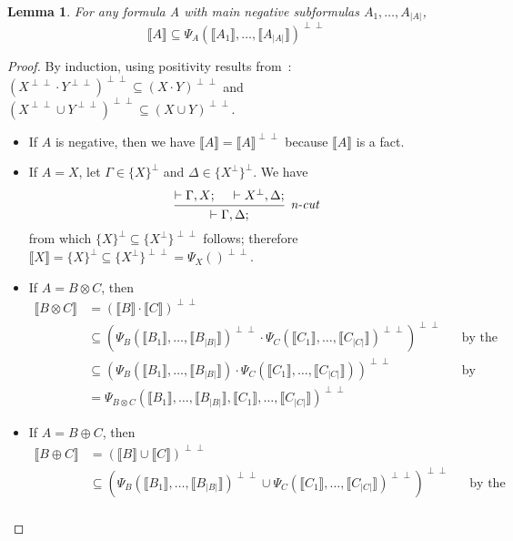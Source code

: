 \documentclass[11pt]{article}
\newtheorem{lemma}[theorem]{Lemma}
\newcommand\size[1]{{\lvert #1 \rvert}}
\newcommand\sem[1]{{\llbracket #1 \rrbracket}}
\newcommand\biperp{{\perp\perp}}
\begin{document}
\begin{lemma}
    \label{positivity}
    For any formula A with main negative subformulas $A_1, \dots, A_\size{A}$,
    $$\sem{A} \subseteq \Psi_A(\sem{A_1}, \dots, \sem{A_\size{A}})^\biperp$$
\end{lemma}
\begin{proof}
    By induction, using positivity results from~\cite[appendix F]{girard}:
    $(X^\biperp \cdot Y^\biperp)^\biperp \subseteq (X \cdot Y)^\biperp$
    and $(X^\biperp \cup Y^\biperp)^\biperp \subseteq (X \cup Y)^\biperp$.
    \begin{itemize}
        \item If $A$ is negative, then we have $\sem{A} = \sem{A}^\biperp$ because $\sem{A}$ is a fact.
        \item If $A = X$, let $\Gamma \in \{X\}^\perp$ and $\Delta \in \{X^\perp\}^\perp$. We have
        $$\begin{prooftree}
            \hypo{\vdash \Gamma, X;}
            \hypo{\vdash X^\perp, \Delta;}
            \infer2[\textit{n-cut}]{\vdash \Gamma, \Delta;}
        \end{prooftree}$$
        from which $\{X\}^\perp \subseteq \{X^\perp\}^\biperp$ follows; therefore
        $\sem{X} = \{X\}^\perp \subseteq \{X^\perp\}^\biperp = \Psi_X()^\biperp$.
        \item If $A = B \otimes C$, then \begin{align*}
            \sem{B \otimes C}
            &= (\sem{B} \cdot \sem{C})^\biperp \\
            &\subseteq (\Psi_B(\sem{B_1}, \dots, \sem{B_\size{B}})^\biperp \cdot \Psi_C(\sem{C_1}, \dots, \sem{C_\size{C}})^\biperp)^\biperp &&\text{by the induction hypothesis} \\
            &\subseteq (\Psi_B(\sem{B_1}, \dots, \sem{B_\size{B}}) \cdot \Psi_C(\sem{C_1}, \dots, \sem{C_\size{C}}))^\biperp &&\text{by positivity} \\
            &= \Psi_{B \otimes C}(\sem{B_1}, \dots, \sem{B_\size{B}}, \sem{C_1}, \dots, \sem{C_\size{C}})^\biperp
        \end{align*}
        \item If $A = B \oplus C$, then \begin{align*}
            \sem{B \oplus C}
            &= (\sem{B} \cup \sem{C})^\biperp \\
            &\subseteq (\Psi_B(\sem{B_1}, \dots, \sem{B_\size{B}})^\biperp \cup \Psi_C(\sem{C_1}, \dots, \sem{C_\size{C}})^\biperp)^\biperp &&\text{by the induction hypothesis} \\

\end{align*}
\end{itemize}
\end{proof}
\end{document}
